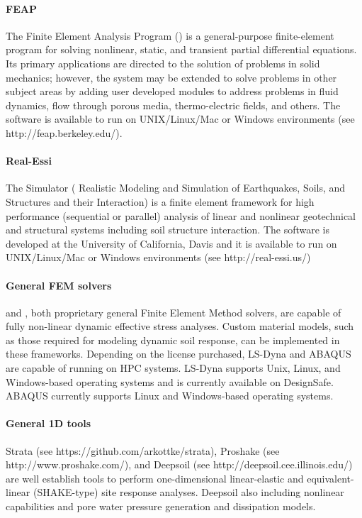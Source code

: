 \paragraph{FEAP} The Finite Element Analysis Program () is a general-purpose finite-element program for solving nonlinear, static, and transient partial differential equations. Its primary applications are directed to the solution of problems in solid mechanics; however, the system may be extended to solve problems in other subject areas by adding user developed modules to address problems in fluid dynamics, flow through porous media, thermo-electric fields, and others. The software is available to run on UNIX/Linux/Mac or Windows environments (see http://feap.berkeley.edu/).

\paragraph{Real-Essi} The  Simulator ( Realistic Modeling and Simulation of Earthquakes, Soils, and Structures and their Interaction) is a finite element framework for high performance (sequential or parallel) analysis of linear and nonlinear geotechnical and structural systems including soil structure interaction. The software is developed at the University of California, Davis and it is available to run on UNIX/Linux/Mac or Windows environments (see http://real-essi.us/)

\paragraph{General FEM solvers}
 and , both proprietary general Finite Element Method solvers, are capable of fully non-linear dynamic effective stress analyses. Custom material models, such as those required for modeling dynamic soil response, can be implemented in these frameworks. Depending on the license purchased, LS-Dyna and ABAQUS are capable of running on HPC systems. LS-Dyna supports Unix, Linux, and Windows-based operating systems and is currently available on DesignSafe. ABAQUS currently supports Linux and Windows-based operating systems.

\paragraph{General 1D tools}
Strata (see https://github.com/arkottke/strata), Proshake (see http://www.proshake.com/), and Deepsoil (see http://deepsoil.cee.illinois.edu/) are well establish tools to perform one-dimensional linear-elastic and equivalent-linear (SHAKE-type) site response analyses. Deepsoil also including nonlinear capabilities and pore water pressure generation and dissipation models.

